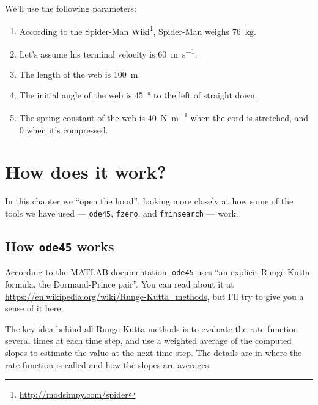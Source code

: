 \documentclass[
]{book}
\numberwithin{Answer}{chapter}
\numberwithin{Exercise}{chapter}
\begin{document}
We'll use the following parameters:


\begin{enumerate}

\item According to the Spider-Man Wiki\footnote{\url{http://modsimpy.com/spider}}, Spider-Man weighs \SI{76}{\kg}.

\item
  Let's assume his terminal velocity is \SI{60}{\meter\per\second}.


\item
  The length of the web is \SI{100}{\meter}.

\item
  The initial angle of the web is \SI{45}{\degree} to the left of straight
  down.

\item
  The spring constant of the web is \SI{40}{\newton\per\meter} when the cord is stretched, and 0 when it's compressed.
  

\end{enumerate}



\chapter{How does it work?}

In this chapter we ``open the hood'', looking more closely at how some of the tools we have used --- {\tt ode45}, {\tt fzero}, and {\tt fminsearch} --- work.


\section{How {\tt ode45} works}
\label{sect:howode45}

According to the MATLAB documentation, {\tt ode45} uses ``an explicit Runge-Kutta formula, the Dormand-Prince pair''.  You can read about it at \url{https://en.wikipedia.org/wiki/Runge-Kutta_methods}, but I'll try to give you a sense of it here.


The key idea behind all Runge-Kutta methods is to evaluate the rate function several times at each time step, and use a weighted average of the computed slopes to estimate the value at the next time step.  The details are in where the rate function is called and how the slopes are averages.
\end{document}

